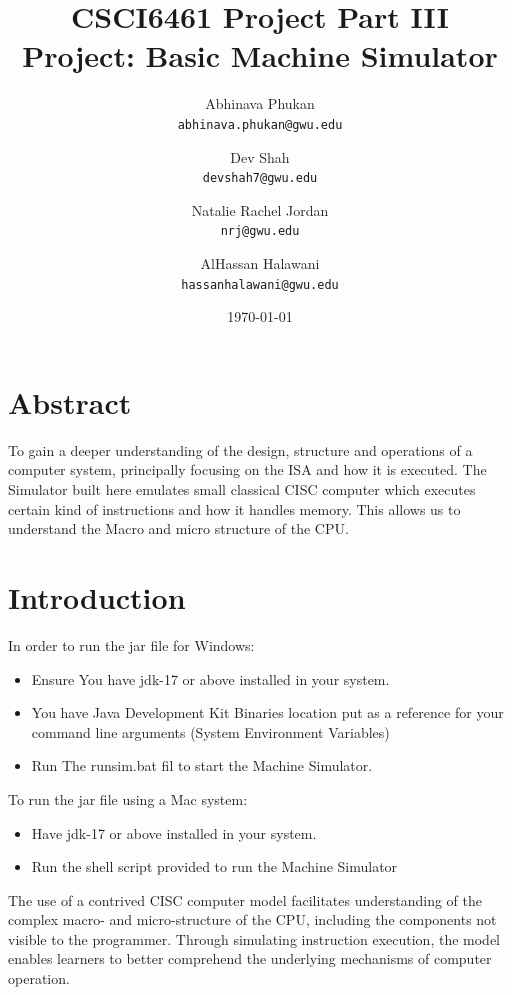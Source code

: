 \documentclass[10pt]{article}
\title{%
  \textbf{\huge CSCI6461 Project Part III} \\
  \Large Project: Basic Machine Simulator
}
\author{
  Abhinava Phukan\\
  \texttt{abhinava.phukan@gwu.edu}
  \and
  Dev Shah\\
  \texttt{devshah7@gwu.edu}
  \and
  Natalie Rachel Jordan\\
  \texttt{nrj@gwu.edu}
  \and
  AlHassan Halawani\\
  \texttt{hassanhalawani@gwu.edu}
}
\date{\today}
\begin{document}
\maketitle

\section*{Abstract}
To gain a deeper understanding of the design, structure and operations of a computer
system, principally focusing on the ISA and how it is executed. The Simulator built here
emulates small classical CISC computer which executes certain kind of instructions and how it handles
memory. This allows us to understand the Macro and micro structure of the CPU.

\section{Introduction}\label{section 1}
In order to run the jar file for Windows:\label{windowsetup}
\begin{itemize}[label=--]
  \item Ensure You have jdk-17 or above installed in your system.
  \item You have Java Development Kit Binaries location put as a reference for your command line arguments (System Environment Variables)
  \item Run The runsim.bat fil to start the Machine Simulator.
\end{itemize}
To run the jar file using a Mac system:\label{macsetup}
\begin{itemize}[label=--]
  \item Have jdk-17 or above installed in your system.
  \item Run the shell script provided to run the Machine Simulator
\end{itemize}
The use of a contrived CISC computer model facilitates understanding of the complex macro- 
and micro-structure of the CPU, including the components not visible to the programmer. 
Through simulating instruction execution, the model enables learners to better comprehend 
the underlying mechanisms of computer operation.
\end{document}
